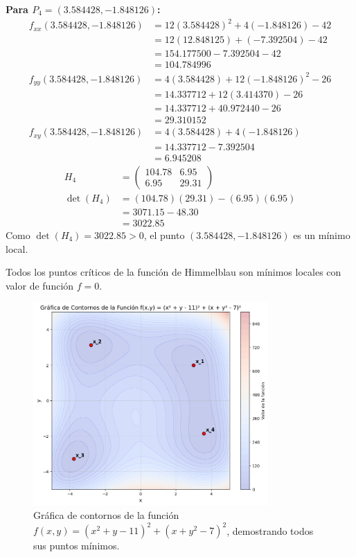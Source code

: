 \documentclass{article}
\begin{document}
\textbf{Para $P_4 = (3.584428, -1.848126)$:}
\begin{align}
f_{xx}(3.584428, -1.848126) &= 12(3.584428)^2 + 4(-1.848126) - 42 \\
&= 12(12.848125) + (-7.392504) - 42 \\
&= 154.177500 - 7.392504 - 42 \\
&= 104.784996 \\
f_{yy}(3.584428, -1.848126) &= 4(3.584428) + 12(-1.848126)^2 - 26 \\
&= 14.337712 + 12(3.414370) - 26 \\
&= 14.337712 + 40.972440 - 26 \\
&= 29.310152 \\
f_{xy}(3.584428, -1.848126) &= 4(3.584428) + 4(-1.848126) \\
&= 14.337712 - 7.392504 \\
&= 6.945208
\end{align}
\begin{align}
H_4 &= \begin{pmatrix} 104.78 & 6.95 \\ 6.95 & 29.31 \end{pmatrix} \\
\det(H_4) &= (104.78)(29.31) - (6.95)(6.95) \\
&= 3071.15 - 48.30 \\
&= 3022.85
\end{align}
Como $\det(H_4) = 3022.85 > 0$, el punto $(3.584428, -1.848126)$ es un mínimo local.

Todos los puntos críticos de la función de Himmelblau son mínimos locales con valor de función $f = 0$.

\begin{figure}[h]
\centering
\includegraphics[width=0.8\textwidth]{images/6d_plot.png}
\caption{Gráfica de contornos de la función $f(x,y) = (x^{2} + y - 11)^{2} + (x + y^{2} - 7)^{2}$, demostrando todos sus puntos mínimos.}
\label{fig:6a_contour}
\end{figure}
\end{document}
